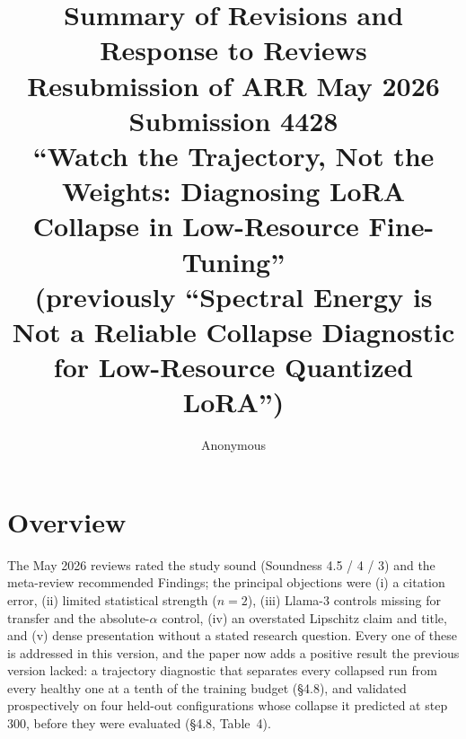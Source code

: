 \documentclass[11pt]{article}
\title{Summary of Revisions and Response to Reviews\\
\large Resubmission of ARR May 2026 Submission 4428\\
\normalsize ``Watch the Trajectory, Not the Weights: Diagnosing LoRA Collapse in Low-Resource Fine-Tuning''\\
(previously ``Spectral Energy is Not a Reliable Collapse Diagnostic for Low-Resource Quantized LoRA'')}
\author{Anonymous}
\date{}
\begin{document}
\maketitle

\section*{Overview}
The May 2026 reviews rated the study sound (Soundness 4.5 / 4 / 3) and the
meta-review recommended Findings; the principal objections were (i) a
citation error, (ii) limited statistical strength ($n{=}2$), (iii) Llama-3
controls missing for transfer and the absolute-$\alpha$ control, (iv) an
overstated Lipschitz claim and title, and (v) dense presentation without a
stated research question. Every one of these is addressed in this version,
and the paper now adds a positive result the previous version lacked: a
trajectory diagnostic that separates every collapsed run from every healthy
one at a tenth of the training budget
(\S4.8), and validated prospectively on four held-out configurations
whose collapse it predicted at step 300, before they were evaluated
(\S4.8, Table~4).
\end{document}
